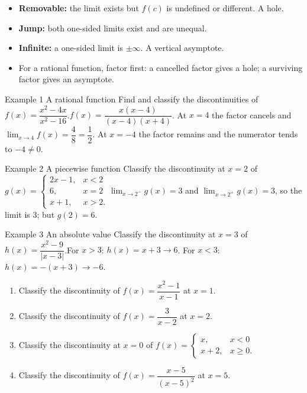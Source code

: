 \documentclass[11pt]{article}
\begin{document}

\begin{ideabox}
\begin{itemize}[leftmargin=*,itemsep=2pt,topsep=2pt]
  \item \textbf{Removable:} the limit exists but $f(c)$ is undefined or different. A hole.
  \item \textbf{Jump:} both one-sided limits exist and are unequal.
  \item \textbf{Infinite:} a one-sided limit is $\pm\infty$. A vertical asymptote.
  \item For a rational function, factor first: a cancelled factor gives a hole; a surviving factor gives an asymptote.
\end{itemize}
\end{ideabox}

\begin{example}{Example 1 \textperiodcentered{} A rational function}
Find and classify the discontinuities of $f(x)=\dfrac{x^2-4x}{x^2-16}$.\soln $f(x)=\dfrac{x(x-4)}{(x-4)(x+4)}$. At $x=4$ the factor cancels and $\displaystyle\lim_{x\to 4}f(x)=\dfrac48=\dfrac12$. At $x=-4$ the factor remains and the numerator tends to $-4\neq0$.
\end{example}

\begin{example}{Example 2 \textperiodcentered{} A piecewise function}
Classify the discontinuity at $x=2$ of $g(x)=\begin{cases}2x-1,&x<2\\6,&x=2\\x+1,&x>2.\end{cases}$\soln $\displaystyle\lim_{x\to 2^-}g(x)=3$ and $\displaystyle\lim_{x\to 2^+}g(x)=3$, so the limit is 3; but $g(2)=6$.
\end{example}

\begin{example}{Example 3 \textperiodcentered{} An absolute value}
Classify the discontinuity at $x=3$ of $h(x)=\dfrac{x^2-9}{|x-3|}$.\soln For $x>3$: $h(x)=x+3\to6$. For $x<3$: $h(x)=-(x+3)\to-6$.
\end{example}

\newpage
{}

\begin{enumerate}[leftmargin=*,itemsep=2pt]
  \item Classify the discontinuity of $f(x)=\dfrac{x^2-1}{x-1}$ at $x=1$.\work{2.3cm}
  \item Classify the discontinuity of $f(x)=\dfrac{3}{x-2}$ at $x=2$.\work{2.3cm}
  \item Classify the discontinuity at $x=0$ of $f(x)=\begin{cases}x,&x<0\\x+2,&x\ge0.\end{cases}$\work{2.3cm}
  \item Classify the discontinuity of $f(x)=\dfrac{x-5}{(x-5)^2}$ at $x=5$.\work{2.3cm}
\end{enumerate}
\end{document}
